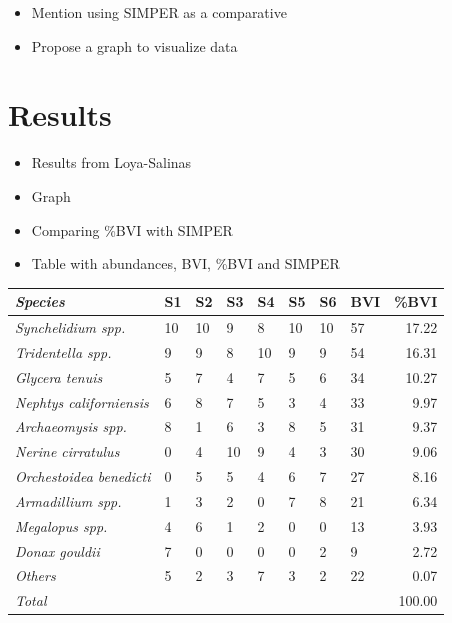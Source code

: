 \documentclass[12pt,]{article}
\providecommand{\tightlist}{%
  \setlength{\itemsep}{0pt}\setlength{\parskip}{0pt}}
\begin{document}
\begin{itemize}
\tightlist
\item
  Mention using SIMPER as a comparative
\item
  Propose a graph to visualize data
\end{itemize}

\section{Results}\label{results}

\begin{itemize}
\tightlist
\item
  Results from Loya-Salinas
\item
  Graph
\item
  Comparing \%BVI with SIMPER
\item
  Table with abundances, BVI, \%BVI and SIMPER
\end{itemize}

\begin{tabular}{>{\em}llllllllr}
\toprule
Species & S1 & S2 & S3 & S4 & S5 & S6 & BVI & \%BVI\\
\midrule
Synchelidium spp. & 10 & 10 & 9 & 8 & 10 & 10 & 57 & 17.22\\
Tridentella spp. & 9 & 9 & 8 & 10 & 9 & 9 & 54 & 16.31\\
Glycera tenuis & 5 & 7 & 4 & 7 & 5 & 6 & 34 & 10.27\\
Nephtys californiensis & 6 & 8 & 7 & 5 & 3 & 4 & 33 & 9.97\\
Archaeomysis spp. & 8 & 1 & 6 & 3 & 8 & 5 & 31 & 9.37\\
\addlinespace
Nerine cirratulus & 0 & 4 & 10 & 9 & 4 & 3 & 30 & 9.06\\
Orchestoidea benedicti & 0 & 5 & 5 & 4 & 6 & 7 & 27 & 8.16\\
Armadillium spp. & 1 & 3 & 2 & 0 & 7 & 8 & 21 & 6.34\\
Megalopus spp. & 4 & 6 & 1 & 2 & 0 & 0 & 13 & 3.93\\
Donax gouldii & 7 & 0 & 0 & 0 & 0 & 2 & 9 & 2.72\\
\addlinespace
Others & 5 & 2 & 3 & 7 & 3 & 2 & 22 & 0.07\\
Total &  &  &  &  &  &  &  & 100.00\\
\bottomrule
\end{tabular}
\end{document}
